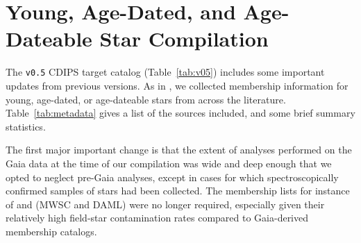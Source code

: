 \documentclass[12pt,modern,twocolumn,tighten]{aastex63}
\begin{document}

% 
% 
% 
% 
% 







\clearpage
                            
 

\appendix
\section{Young, Age-Dated, and Age-Dateable Star Compilation}
\label{app:targetlist}




The \texttt{v0.5} CDIPS target catalog (Table~\ref{tab:v05}) includes
some important updates from previous versions.  As in
\citet{bouma_cdipsI_2019}, we collected membership information for
young, age-dated, or age-dateable stars from across the literature.
Table~\ref{tab:metadata} gives a list of the sources included, and
some brief summary statistics.

The first major important change is that the extent of analyses
performed on the Gaia data at the time of our compilation was wide and
deep enough that we opted to neglect pre-Gaia analyses, except in
cases for which spectroscopically confirmed samples of stars had been
collected.  The membership lists for instance of
\citet{Kharchenko_et_al_2013} and \citet{dias_proper_2014} (MWSC and
DAML) were no longer required, especially given their relatively high
field-star contamination rates compared to Gaia-derived membership
catalogs.
\end{document}
